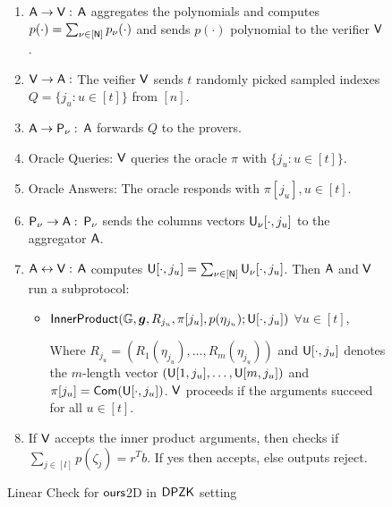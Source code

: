 \begin{figure}[h!]
\begin{framed}
\begin{enumerate}
	\item $\mathsf{A} \rightarrow \mathsf{V} : $ $\mathsf{A}$ aggregates the polynomials and computes $p(\cdot)=\sum_{\nu\in[\mathsf{N}]} p_{\nu}(\cdot)$ and sends $p(\cdot)$ polynomial to the verifier $\mathsf{V}$.
	
	\item $\mathsf{V} \rightarrow \mathsf{A} : $ The veifier $\mathsf{V}$ sends $t$ randomly picked sampled indexes $Q= \{j_u: u\in[t]\}$ from $[n]$. 
	
	\item $\mathsf{A} \rightarrow \mathsf{P}_{\nu} : $ $\mathsf{A}$ forwards $Q$ to the provers.
	
	\item Oracle Queries: $\mathsf{V}$ queries the oracle $\pi$ with $\{j_u:u\in[t]\}$.
	
	\item Oracle Answers: The oracle responds with $\pi[j_u], u\in[t]$.
	
	\item $\mathsf{P}_{\nu} \rightarrow \mathsf{A} : $ $\mathsf{P}_{\nu}$ sends the columns vectors $\mathsf{U}_{\nu}[\cdot,j_u]$ to the aggregator $\mathsf{A}$.
	
	\item $\mathsf{A} \leftrightarrow \mathsf{V} : $ $\mathsf{A}$ computes $\mathsf{U}[\cdot,j_u] = \sum_{\nu \in [\mathsf{N}]} \mathsf{U}_{\nu}[\cdot, j_u]$. Then $\mathsf{A}$ and $\mathsf{V}$ run a subprotocol:
	\begin{itemize}
		\item $\mathsf{InnerProduct}(\mathbb{G},\bm{g}, R_{j_u}, \pi[j_u], p(\eta_{j_u}); \mathsf{U}[\cdot,j_u])$ $\forall u\in [t]$,
		
		Where $R_{j_u} = (R_1( \eta_{j_u}) , \ldots , R_m( \eta_{j_u}))$ and $\mathsf{U}[\cdot,j_u]$ denotes the $m$-length vector $(\mathsf{U}[1,j_u], \ldots, \mathsf{U}[m,j_u])$ and $\pi[j_u] = \mathsf{Com}(\mathsf{U}[\cdot, j_u])$. $\mathsf{V}$ proceeds if the arguments succeed for all $u \in [t]$.
	\end{itemize}
 
	\item If $\mathsf{V}$ accepts the inner product arguments, then checks if $\sum_{j\in[l]} p(\zeta_j) = r^Tb$. If yes then accepts, else outputs reject.
\end{enumerate}
\end{framed}
\caption{Linear Check for $\textsf{ours}$2D in $\mathsf{DPZK}$ setting}
\end{figure}
